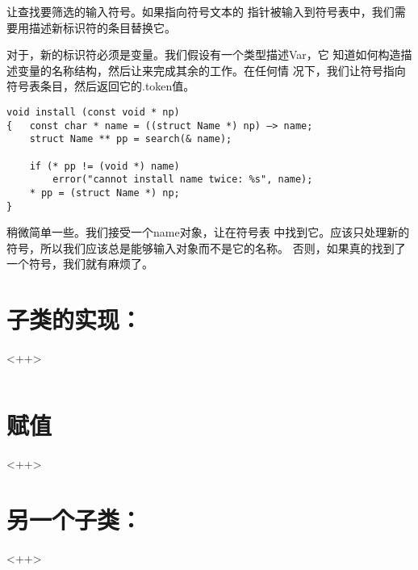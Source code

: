     让查找要筛选的输入符号。如果指向符号文本的
指针被输入到符号表中，我们需要用描述新标识符的条目替换它。

    对于，新的标识符必须是变量。我们假设有一个类型描述Var，它
知道如何构造描述变量的名称结构，然后让来完成其余的工作。在任何情
况下，我们让符号指向符号表条目，然后返回它的.token值。

\begin{lstlisting}
void install (const void * np) 
{   const char * name = ((struct Name *) np) —> name; 
    struct Name ** pp = search(& name); 
    
    if (* pp != (void *) name) 
        error("cannot install name twice: %s", name); 
    * pp = (struct Name *) np; 
}
\end{lstlisting}

    稍微简单一些。我们接受一个name对象，让在符号表
中找到它。应该只处理新的符号，所以我们应该总是能够输入对象而不是它的名称。
否则，如果真的找到了一个符号，我们就有麻烦了。

\section{子类的实现：}<++>

\begin{lstlisting}
\end{lstlisting}

\section{赋值}<++>

\section{另一个子类：}<++>

